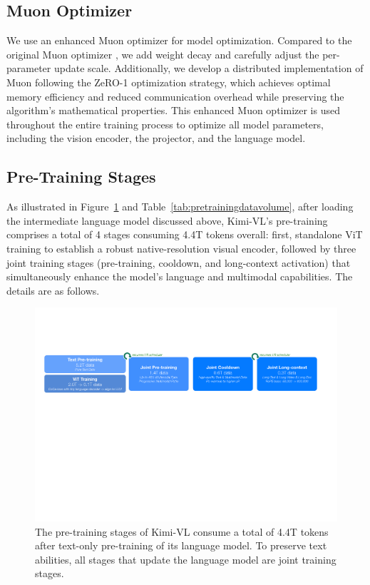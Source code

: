 \documentclass{article}
\newcommand{\ourname}{{Kimi-VL}}
\newcommand{\citep}[1]{\parencite{#1}}
\begin{document}
\subsection{Muon Optimizer}

We use an enhanced Muon optimizer \citep{liu2025muon}  for model optimization. Compared to the original Muon optimizer \citep{jordan2024muon}, we add weight decay and carefully adjust the per-parameter update scale. Additionally, we develop a distributed implementation of Muon following the ZeRO-1 \citep{rajbhandari2020zero} optimization strategy, which achieves optimal memory efficiency and reduced communication overhead while preserving the algorithm’s mathematical properties. This enhanced Muon optimizer is used throughout the entire training process to optimize all model parameters, including the vision encoder, the projector, and the language model.


\subsection{Pre-Training Stages}
\label{sec:pretraining_stages}


As illustrated in Figure~\ref{fig:pretrainingstages} and Table~\ref{tab:pretrainingdatavolume}, after loading the intermediate language model discussed above, \ourname's pre-training comprises a total of 4 stages consuming 4.4T tokens overall: first, standalone ViT training to establish a robust native-resolution visual encoder, followed by three joint training stages (pre-training, cooldown, and long-context activation) that simultaneously enhance the model's language and multimodal capabilities. The details are as follows.

\begin{figure}[t]
\centering
\includegraphics[width=\textwidth]{figures/pretraining_stages.pdf}
\caption{The pre-training stages of \ourname{} consume a total of 4.4T tokens after text-only pre-training of its language model. To preserve text abilities, all stages that update the language model are joint training stages.}
\label{fig:pretrainingstages}
\end{figure}
\end{document}
